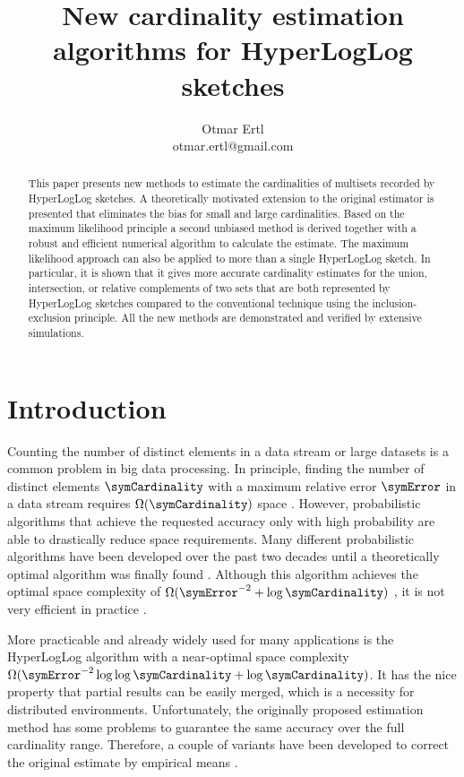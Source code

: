 \documentclass[a4paper]{scrartcl}
\title{New cardinality estimation algorithms for HyperLogLog sketches}
\author{Otmar Ertl \\ otmar.ertl@gmail.com}
\begin{document}
\maketitle
\let\thefootnote\relax{}
\begin{abstract}
This paper presents new methods to estimate the cardinalities of multisets recorded by HyperLogLog sketches. A theoretically motivated extension to the original estimator is presented that eliminates the bias for small and large cardinalities. Based on the maximum likelihood principle a second unbiased method is derived together with a robust and efficient numerical algorithm to calculate the estimate. The maximum likelihood approach can also be applied to more than a single HyperLogLog sketch. In particular, it is shown that it gives more accurate cardinality estimates for the union, intersection, or relative complements of two sets that are both represented by HyperLogLog sketches compared to the conventional technique using the inclusion-exclusion principle. All the new methods are demonstrated and verified by extensive simulations.
\end{abstract}

\section{Introduction}
Counting the number of distinct elements in a data stream or large datasets is a common problem in big data processing. In principle, finding the number of distinct elements $\symCardinality$ with a maximum relative error $\symError$  in a data stream requires $\Omega(\symCardinality)$ space \cite{Alon1999}. However, probabilistic algorithms that achieve the requested accuracy only with high probability are able to drastically reduce space requirements. Many different probabilistic algorithms have been developed over the past two decades \cite{Metwally2008,Ting2014} until a theoretically optimal algorithm was finally found \cite{Kane2010}. Although this algorithm achieves the optimal space complexity of $\Omega(\symError^{-2}+\log \symCardinality)$ \cite{Alon1999, Indyk2003}, it is not very efficient in practice \cite{Ting2014}.

More practicable and already widely used for many applications is the HyperLogLog algorithm \cite{Flajolet2007} with a near-optimal space complexity $\Omega(\symError^{-2} \log\log\symCardinality +\log \symCardinality)$. It has the nice property that partial results can be easily merged, which is a necessity for distributed environments. Unfortunately, the originally proposed estimation method has some problems to guarantee the same accuracy over the full cardinality range. Therefore, a couple of variants have been developed to correct the original estimate by empirical means \cite{Heule2013,Rhodes2015,Sanfilippo2014}. 
\end{document}
